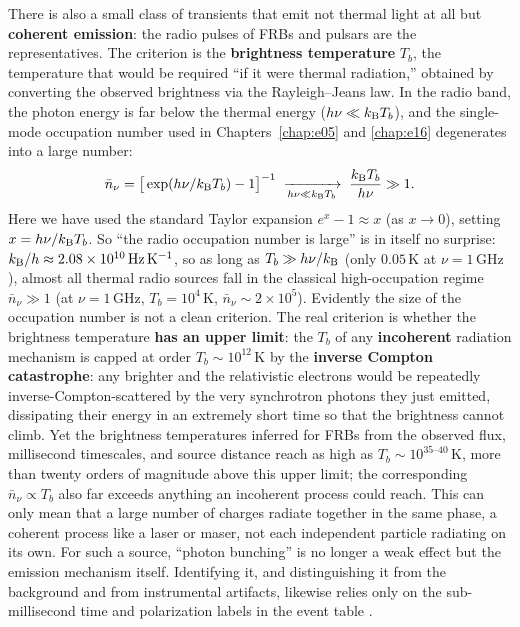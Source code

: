 There is also a small class of transients that emit not thermal light at all but \textbf{coherent emission}: the radio pulses of FRBs and pulsars are the representatives. The criterion is the \textbf{brightness temperature} \(T_b\), the temperature that would be required ``if it were thermal radiation,'' obtained by converting the observed brightness via the Rayleigh--Jeans law. In the radio band, the photon energy is far below the thermal energy (\(h\nu\ll k_{\rm B}T_b\)), and the single-mode occupation number used in Chapters~\ref{chap:e05} and \ref{chap:e16} degenerates into a large number:
\[
  \bar n_\nu=\big[\exp(h\nu/k_{\rm B}T_b)-1\big]^{-1}
  \;\xrightarrow[h\nu\ll k_{\rm B}T_b]{}\;
  \frac{k_{\rm B}T_b}{h\nu}\gg1 .
\]
Here we have used the standard Taylor expansion \(e^x-1\approx x\) (as \(x\to0\)), setting \(x=h\nu/k_{\rm B}T_b\). So ``the radio occupation number is large'' is in itself no surprise: \(k_{\rm B}/h\approx2.08\times10^{10}\,\mathrm{Hz\,K^{-1}}\), so as long as \(T_b\gg h\nu/k_{\rm B}\) (only \(0.05\,\mathrm{K}\) at \(\nu=1\,\mathrm{GHz}\)), almost all thermal radio sources fall in the classical high-occupation regime \(\bar n_\nu\gg1\) (at \(\nu=1\,\mathrm{GHz}\), \(T_b=10^4\,\mathrm{K}\), \(\bar n_\nu\sim2\times10^5\)). Evidently the size of the occupation number is not a clean criterion. The real criterion is whether the brightness temperature \textbf{has an upper limit}: the \(T_b\) of any \textbf{incoherent} radiation mechanism is capped at order \(T_b\sim10^{12}\,\mathrm{K}\) by the \textbf{inverse Compton catastrophe}: any brighter and the relativistic electrons would be repeatedly inverse-Compton-scattered by the very synchrotron photons they just emitted, dissipating their energy in an extremely short time so that the brightness cannot climb. Yet the brightness temperatures inferred for FRBs from the observed flux, millisecond timescales, and source distance reach as high as \(T_b\sim10^{35\text{--}40}\,\mathrm{K}\), more than twenty orders of magnitude above this upper limit; the corresponding \(\bar n_\nu\propto T_b\) also far exceeds anything an incoherent process could reach. This can only mean that a large number of charges radiate together in the same phase, a coherent process like a laser or maser, not each independent particle radiating on its own. For such a source, ``photon bunching'' is no longer a weak effect but the emission mechanism itself. Identifying it, and distinguishing it from the background and from instrumental artifacts, likewise relies only on the sub-millisecond time and polarization labels in the event table \citep{2020Natur.587...59B,2020Natur.587...54C,2020Natur.581..391M}.

